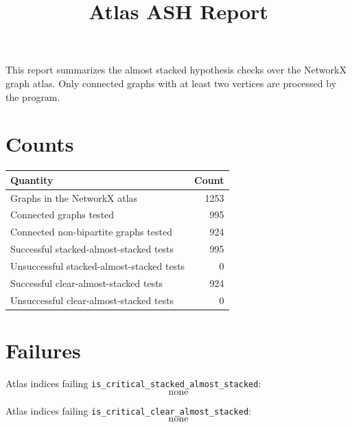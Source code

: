 \documentclass{amsart}
\title{Atlas ASH Report}
\author{}
\date{}
\begin{document}
\maketitle

This report summarizes the almost stacked hypothesis checks over the NetworkX graph atlas.
Only connected graphs with at least two vertices are processed by the program.

\section*{Counts}

\begin{center}
\begin{tabular}{lr}
\toprule
Quantity & Count \\
\midrule
Graphs in the NetworkX atlas & 1253 \\
Connected graphs tested & 995 \\
Connected non-bipartite graphs tested & 924 \\
Successful stacked-almost-stacked tests & 995 \\
Unsuccessful stacked-almost-stacked tests & 0 \\
Successful clear-almost-stacked tests & 924 \\
Unsuccessful clear-almost-stacked tests & 0 \\
\bottomrule
\end{tabular}
\end{center}

\section*{Failures}

Atlas indices failing \texttt{is\_critical\_stacked\_almost\_stacked}:
\[
\text{none}
\]

Atlas indices failing \texttt{is\_critical\_clear\_almost\_stacked}:
\[
\text{none}
\]
\end{document}
